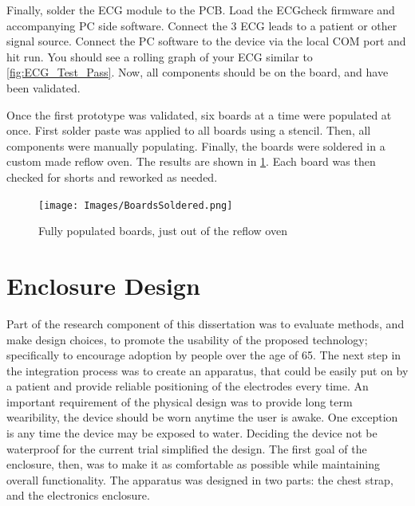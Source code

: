 Finally, solder the ECG module to the PCB. Load the ECGcheck firmware and accompanying PC side software. Connect the 3 ECG leads to a patient or other signal source. Connect the PC software to the device via the local COM port and hit run. You should see a rolling graph of your ECG similar to \cref{fig:ECG_Test_Pass}. Now, all components should be on the board, and have been validated.


Once the first prototype was validated, six boards at a time were populated at once. First solder paste was applied to all boards using a stencil. Then, all components were manually populating. Finally, the boards were soldered in a custom made reflow oven. The results are shown in \cref{fig:ReflowedBoards}. Each board was then checked for shorts and reworked as needed.

\begin{figure}[ht]
\begin{center}
	\label{fig:ReflowedBoards}
	\texttt{[image: Images/BoardsSoldered.png]} 
	\caption{Fully populated boards, just out of the reflow oven}
\end{center}
\end{figure}


\section {Enclosure Design}
\label{sec:EnclosureDesign}
Part of the research component of this dissertation was to evaluate methods, and make design choices, to promote the usability of the  proposed technology; specifically to encourage adoption by people over the age of 65. The next step in the integration process was to create an apparatus, that could be easily put on by a patient and provide reliable positioning of the electrodes every time. An important requirement of the physical design was to provide long term wearibility, the device should be worn anytime the user is awake. One exception is any time the device may be exposed to water. Deciding the device not be waterproof for the current trial simplified the design. The first goal of the enclosure, then, was to make it as comfortable as possible while maintaining overall functionality. The apparatus was designed in two parts: the chest strap, and the electronics enclosure. 




